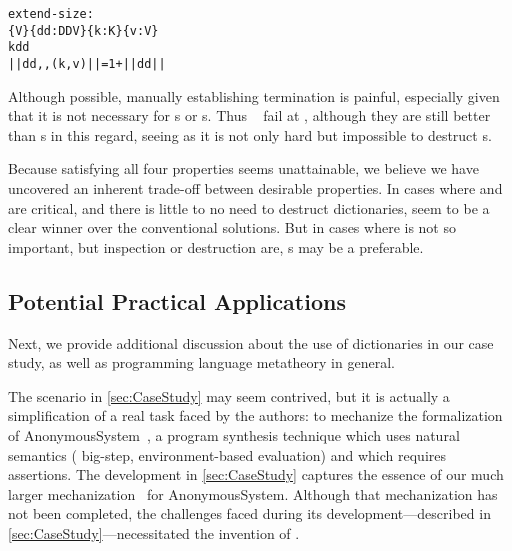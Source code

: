 \begin{alltt}
  extend-size :
    \altFAll\{V\} \{dd : DD V\} \{k : K\} \{v : V\} \altRArr
      k \altNIn dd \altRArr
      || dd ,, (k , v) || = 1 + || dd ||
\end{alltt}

Although possible, manually establishing termination is painful, especially given that it is not necessary
for {\sal}s or {\cal}s. Thus \dds~ fail at \EzDstr, although they are still better than {\fpf}s in this
regard, seeing as it is not only hard but impossible to destruct {\fpf}s.



Because satisfying all four properties seems unattainable,
we believe we have uncovered an
inherent trade-off between desirable properties. In cases where \SemTot{} and \EqDec{} are critical,
and there is little to no need to destruct dictionaries, \dds{} seem to be a clear winner over
the conventional solutions. But in cases where \SemTot{} is not so important,
but inspection or destruction are, {\cal}s may be a preferable.

\subsection{Potential Practical Applications}
\label{sec:Discussion:Generality}

Next, we provide additional discussion about the use of dictionaries in our case study, as well as programming language metatheory in general.



The scenario in \autoref{sec:CaseStudy} may seem contrived, but it is actually a simplification of a real task faced by the authors:
%
to mechanize the formalization of AnonymousSystem~\citep{AnonymousSystem}, a program synthesis technique which uses
natural semantics (\ie{} big-step, environment-based evaluation) and which requires assertions.
%
The development in \autoref{sec:CaseStudy} captures the essence of our much larger mechanization~\citep{AnonymousURL} for AnonymousSystem.
%
Although that mechanization has not been completed, the challenges faced during its development---described in \autoref{sec:CaseStudy}---necessitated the invention of \dds.

